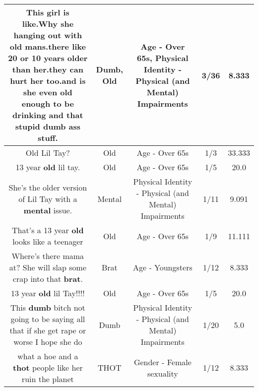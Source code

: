 \documentclass[11pt]{article}
\newlength\mylength
\begin{document}
\begin{center}
\begin{longtable}{|C{.65\mylength}|C{.30\mylength}|C{.12\mylength}|C{.12\mylength}|C{.12\mylength}|}
  \small This girl is like.Why she hanging out with \textbf{old} mans.there like 20 or 10 years older than her.they can hurt her too.and is she even \textbf{old} enough to be drinking and that stupid \textbf{dumb} ass stuff.\normalsize   & Dumb, Old & Age - Over 65s, Physical Identity - Physical (and Mental) Impairments & 3/36 & 8.333 \\  \hline
  \small Old Lil Tay?\normalsize   & Old & Age - Over 65s & 1/3 & 33.333 \\  \hline
  \small 13 year \textbf{old} lil tay.\normalsize   & Old & Age - Over 65s & 1/5 & 20.0 \\  \hline
  \small She's the older version of Lil Tay with a \textbf{mental} issue.\normalsize   & Mental & Physical Identity - Physical (and Mental) Impairments & 1/11 & 9.091 \\  \hline
  \small That's a 13 year \textbf{old} looks like a teenager\normalsize   & Old & Age - Over 65s & 1/9 & 11.111 \\  \hline
  \small Where's there mama at? She will slap some crap into that \textbf{brat}.\normalsize   & Brat & Age - Youngsters & 1/12 & 8.333 \\  \hline
  \small 13 year \textbf{old} lil Tay!!!!\normalsize   & Old & Age - Over 65s & 1/5 & 20.0 \\  \hline
  \small This \textbf{dumb} bitch not going to be saying all that if she get rape or worse I hope she do\normalsize   & Dumb & Physical Identity - Physical (and Mental) Impairments & 1/20 & 5.0 \\  \hline
  \small what a hoe and a  \textbf{thot} people like her ruin  the planet\normalsize   & THOT & Gender - Female sexuality & 1/12 & 8.333 \\  \hline

\end{longtable}
\end{center}
\end{document}
